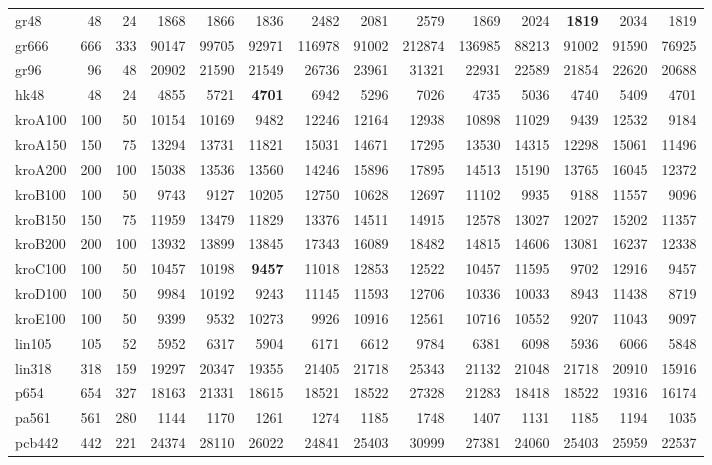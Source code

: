 {\begin{longtable}{l r r r r r r r r r r r r r}
gr48 & 48 & 24 & 1868 & 1866 & 1836 & 2482 & 2081 & 2579 & 1869 & 2024 & \textbf{1819} & 2034 & 1819 \\
gr666 & 666 & 333 & 90147 & 99705 & 92971 & 116978 & 91002 & 212874 & 136985 & 88213 & 91002 & 91590 & 76925 \\
gr96 & 96 & 48 & 20902 & 21590 & 21549 & 26736 & 23961 & 31321 & 22931 & 22589 & 21854 & 22620 & 20688 \\
hk48 & 48 & 24 & 4855 & 5721 & \textbf{4701} & 6942 & 5296 & 7026 & 4735 & 5036 & 4740 & 5409 & 4701 \\
kroA100 & 100 & 50 & 10154 & 10169 & 9482 & 12246 & 12164 & 12938 & 10898 & 11029 & 9439 & 12532 & 9184 \\
kroA150 & 150 & 75 & 13294 & 13731 & 11821 & 15031 & 14671 & 17295 & 13530 & 14315 & 12298 & 15061 & 11496 \\
kroA200 & 200 & 100 & 15038 & 13536 & 13560 & 14246 & 15896 & 17895 & 14513 & 15190 & 13765 & 16045 & 12372 \\
kroB100 & 100 & 50 & 9743 & 9127 & 10205 & 12750 & 10628 & 12697 & 11102 & 9935 & 9188 & 11557 & 9096 \\
kroB150 & 150 & 75 & 11959 & 13479 & 11829 & 13376 & 14511 & 14915 & 12578 & 13027 & 12027 & 15202 & 11357 \\
kroB200 & 200 & 100 & 13932 & 13899 & 13845 & 17343 & 16089 & 18482 & 14815 & 14606 & 13081 & 16237 & 12338 \\
kroC100 & 100 & 50 & 10457 & 10198 & \textbf{9457} & 11018 & 12853 & 12522 & 10457 & 11595 & 9702 & 12916 & 9457 \\
kroD100 & 100 & 50 & 9984 & 10192 & 9243 & 11145 & 11593 & 12706 & 10336 & 10033 & 8943 & 11438 & 8719 \\
kroE100 & 100 & 50 & 9399 & 9532 & 10273 & 9926 & 10916 & 12561 & 10716 & 10552 & 9207 & 11043 & 9097 \\
lin105 & 105 & 52 & 5952 & 6317 & 5904 & 6171 & 6612 & 9784 & 6381 & 6098 & 5936 & 6066 & 5848 \\
lin318 & 318 & 159 & 19297 & 20347 & 19355 & 21405 & 21718 & 25343 & 21132 & 21048 & 21718 & 20910 & 15916 \\
p654 & 654 & 327 & 18163 & 21331 & 18615 & 18521 & 18522 & 27328 & 21283 & 18418 & 18522 & 19316 & 16174 \\
pa561 & 561 & 280 & 1144 & 1170 & 1261 & 1274 & 1185 & 1748 & 1407 & 1131 & 1185 & 1194 & 1035 \\
pcb442 & 442 & 221 & 24374 & 28110 & 26022 & 24841 & 25403 & 30999 & 27381 & 24060 & 25403 & 25959 & 22537 \\

\end{longtable}}
